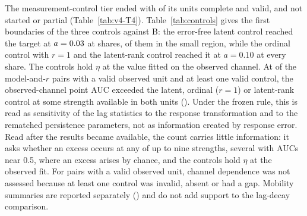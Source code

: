The measurement-control tier ended with  of its  units complete and valid, and  not started or partial (Table~\ref{tab:v4-T4}). Table~\ref{tab:controls} gives the first boundaries of the three controls against B: the error-free latent control reached the target at $a=\resultnum{j.grid.a0300}{0.03}$ at  shares,  of them in the small region, while the ordinal control with $r=1$ and the latent-rank control reached it at $a=0.10$ at every share. The controls hold $\eta$ at the value fitted on the observed channel.
At  of the  model-and-$r$ pairs with a valid observed unit and at least one valid control, the observed-channel point AUC exceeded the latent, ordinal ($r=1$) or latent-rank control at some strength available in both units (\allunitsresource). Under the frozen rule, this is read as sensitivity of the lag statistics to the response transformation and to the rematched persistence parameters, not as information created by response error. Read after the results became available, the count carries little information: it asks whether an excess occurs at any of up to nine strengths, several with AUCs near 0.5, where an excess arises by chance, and the controls hold $\eta$ at the observed fit.
For  pairs with a valid observed unit, channel dependence was not assessed because at least one control was invalid, absent or had a gap. Mobility summaries are reported separately (\allunitsresource) and do not add support to the lag-decay comparison.

